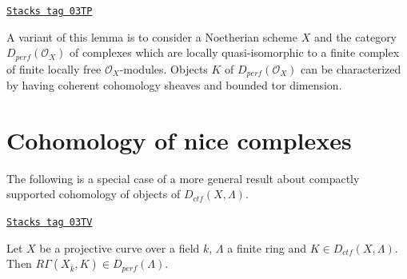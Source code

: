 \begin{remark}[Variant]
\label{trace-remark-variant}
\href{https://stacks.math.columbia.edu/tag/03TP}{\texttt{Stacks tag 03TP}}

A variant of this lemma is to consider a Noetherian scheme $X$
and the category $D_{perf}(\mathcal{O}_X)$ of complexes which are locally
quasi-isomorphic to a finite complex of finite locally free
$\mathcal{O}_X$-modules. Objects $K$ of $D_{perf}(\mathcal{O}_X)$
can be characterized by having coherent cohomology sheaves and
bounded tor dimension.
\end{remark}

\section{Cohomology of nice complexes}
\label{trace-section-cohomology-ctf}
The following is a special case of a more general result about
compactly supported cohomology of objects of $D_{ctf}(X, \Lambda)$.

\begin{proposition}
\label{trace-proposition-projective-curve-constructible-cohomology}
\href{https://stacks.math.columbia.edu/tag/03TV}{\texttt{Stacks tag 03TV}}

Let $X$ be a projective curve over a field $k$, $\Lambda$ a finite ring and
$K\in D_{ctf}(X, \Lambda)$. Then $R\Gamma(X_{\bar k}, K)\in
D_{perf}(\Lambda)$.
\end{proposition}

